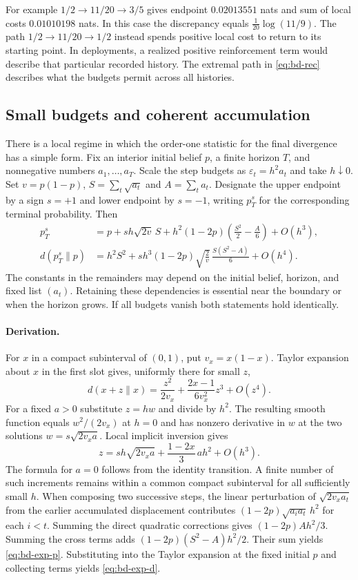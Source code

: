 \documentclass[12pt,letterpaper]{article}
\begin{document}
For example $1/2\to 11/20\to 3/5$ gives endpoint $0.02013551$ nats and sum of local costs $0.01010198$ nats. In this case the discrepancy equals $\tfrac1{20}\log(11/9)$. The path $1/2\to 11/20\to1/2$ instead spends positive local cost to return to its starting point. In deployments, a realized positive reinforcement term would describe that particular recorded history. The extremal path in \eqref{eq:bd-rec} describes what the budgets permit across all histories.

\subsection{Small budgets and coherent accumulation}

There is a local regime in which the order-one statistic for the final divergence has a simple form. Fix an interior initial belief $p$, a finite horizon $T$, and nonnegative numbers $a_1,\ldots,a_T$. Scale the step budgets as $\varepsilon_t=h^2a_t$ and take $h\downarrow 0$. Set $v=p(1-p)$, $S=\sum_t\sqrt{a_t}$ and $A=\sum_t a_t$. Designate the upper endpoint by a sign $s=+1$ and lower endpoint by $s=-1$, writing $p_T^{s}$ for the corresponding terminal probability. Then
\begin{align}
 p_T^{s}
 &=p+s h\sqrt{2v}\,S
   + h^2(1-2p)\left(\frac{S^2}{2}-\frac A6\right)+O(h^3),
 \label{eq:bd-exp-p}\\
 d(p_T^{s}\|p)
 &=h^2S^2
   + s h^3(1-2p)\sqrt{\frac2v}\,
      \frac{S(S^2-A)}{6}+O(h^4).
 \label{eq:bd-exp-d}
\end{align}
The constants in the remainders may depend on the initial belief, horizon, and fixed list $(a_t)$. Retaining these dependencies is essential near the boundary or when the horizon grows. If all budgets vanish both statements hold identically.

\paragraph{Derivation.}
For $x$ in a compact subinterval of $(0,1)$, put $v_x=x(1-x)$. Taylor expansion about $x$ in the first slot gives, uniformly there for small $z$,
\[
 d(x+z\|x)
 =\frac{z^2}{2v_x}+\frac{2x-1}{6v_x^2}z^3+O(z^4).
\]
For a fixed $a>0$ substitute $z=h w$ and divide by $h^2$. The resulting smooth function equals $w^2/(2v_x)$ at $h=0$ and has nonzero derivative in $w$ at the two solutions $w=s\sqrt{2v_xa}$. Local implicit inversion gives
\[
 z=s h\sqrt{2v_xa}+\frac{1-2x}{3}\,a h^2+O(h^3).
\]
The formula for $a=0$ follows from the identity transition. A finite number of such increments remains within a common compact subinterval for all sufficiently small $h$. When composing two successive steps, the linear perturbation of $\sqrt{2v_xa_t}$ from the earlier accumulated displacement contributes $(1-2p)\sqrt{a_i a_t}\,h^2$ for each $i<t$. Summing the direct quadratic corrections gives $(1-2p)Ah^2/3$. Summing the cross terms adds $(1-2p)(S^2-A)h^2/2$. Their sum yields \eqref{eq:bd-exp-p}. Substituting into the Taylor expansion at the fixed initial $p$ and collecting terms yields \eqref{eq:bd-exp-d}.
\end{document}
